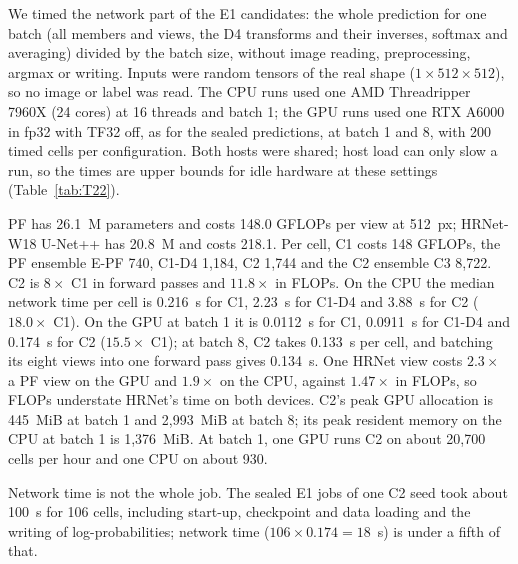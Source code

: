 We timed the network part of the E1 candidates: the whole prediction for one batch (all members and views, the D4 transforms and
their inverses, softmax and averaging) divided by the batch size, without image reading, preprocessing, argmax or writing. Inputs were
random tensors of the real shape ($1\times512\times512$), so no image or label was read. The CPU runs used one AMD Threadripper 7960X
(24 cores) at 16 threads and batch 1; the GPU runs used one RTX A6000 in fp32 with TF32 off, as for the sealed predictions, at batch 1
and 8, with 200 timed cells per configuration. Both hosts were shared; host load can only slow a run, so the times are upper bounds
for idle hardware at these settings (Table~\ref{tab:T22}).

PF has 26.1~M parameters and costs 148.0 GFLOPs per view at 512~px; HRNet-W18 U-Net++ has 20.8~M and costs 218.1. Per cell, C1 costs
148 GFLOPs, the PF ensemble E-PF 740, C1-D4 1,184, C2 1,744 and the C2 ensemble C3 8,722. C2 is $8\times$ C1 in forward passes and
$11.8\times$ in FLOPs. On the CPU the median network time per cell is 0.216~s for C1, 2.23~s for C1-D4 and 3.88~s for C2 ($18.0\times$
C1). On the GPU at batch 1 it is 0.0112~s for C1, 0.0911~s for C1-D4 and 0.174~s for C2 ($15.5\times$ C1); at batch 8, C2 takes 0.133~s per cell, and batching its eight views into one forward pass gives 0.134~s. One HRNet view costs
$2.3\times$ a PF view on the GPU and $1.9\times$ on the CPU, against $1.47\times$ in FLOPs, so FLOPs understate HRNet's time on both
devices. C2's peak GPU allocation is 445~MiB at batch 1 and 2,993~MiB at batch 8; its peak resident memory on the CPU at batch 1 is
1,376~MiB. At batch 1, one GPU runs C2 on about 20,700 cells per hour and one CPU on about 930.

Network time is not the whole job. The sealed E1 jobs of one C2 seed took about 100~s for 106 cells, including start-up, checkpoint
and data loading and the writing of log-probabilities; network time ($106\times0.174=18$~s) is under a fifth of that.


